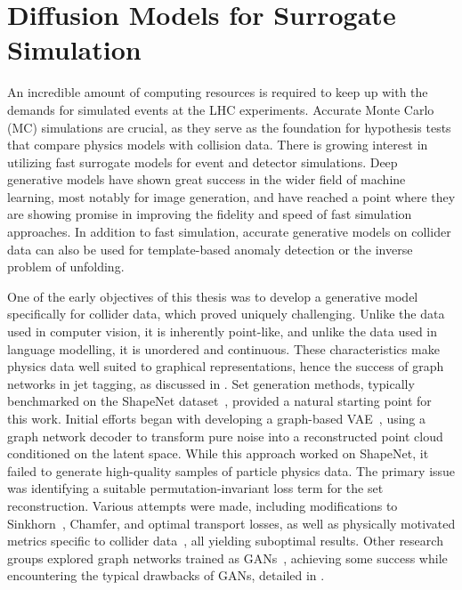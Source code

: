\chapter{Diffusion Models for Surrogate Simulation}
\label{ch:jet_generation}

An incredible amount of computing resources is required to keep up with the demands for simulated events at the LHC experiments.
Accurate Monte Carlo (MC) simulations are crucial, as they serve as the foundation for hypothesis tests that compare physics models with collision data.
There is growing interest in utilizing fast surrogate models for event and detector simulations.
Deep generative models have shown great success in the wider field of machine learning, most notably for image generation, and have reached a point where they are showing promise in improving the fidelity and speed of fast simulation approaches.
In addition to fast simulation, accurate generative models on collider data can also be used for template-based anomaly detection or the inverse problem of unfolding.

One of the early objectives of this thesis was to develop a generative model specifically for collider data, which proved uniquely challenging.
Unlike the data used in computer vision, it is inherently point-like, and unlike the data used in language modelling, it is unordered and continuous.
These characteristics make physics data well suited to graphical representations, hence the success of graph networks in jet tagging, as discussed in .
Set generation methods, typically benchmarked on the ShapeNet dataset~\cite{ShapeNet}, provided a natural starting point for this work.
Initial efforts began with developing a graph-based VAE~\cite{SetVAE}, using a graph network decoder to transform pure noise into a reconstructed point cloud conditioned on the latent space.
While this approach worked on ShapeNet, it failed to generate high-quality samples of particle physics data.
The primary issue was identifying a suitable permutation-invariant loss term for the set reconstruction.
Various attempts were made, including modifications to Sinkhorn~\cite{Sinkhorn}, Chamfer, and optimal transport losses, as well as physically motivated metrics specific to collider data~\cite{MetricSpaceCollider}, all yielding suboptimal results.
Other research groups explored graph networks trained as GANs~\cite{MPGAN, EPICGAN}, achieving some success while encountering the typical drawbacks of GANs, detailed in .

